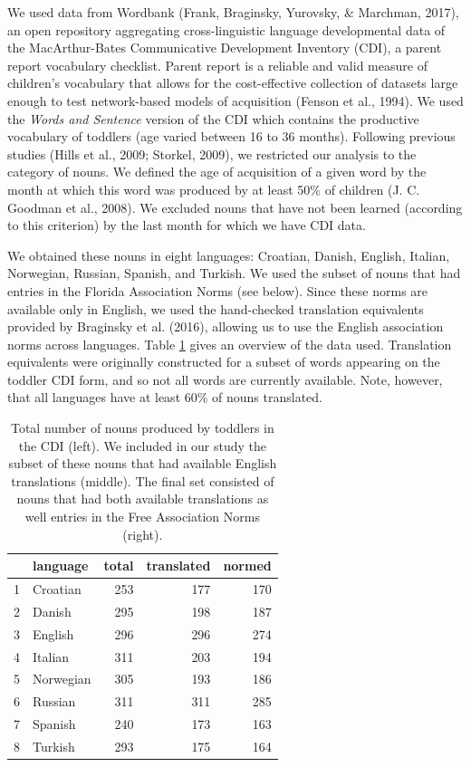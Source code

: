 \documentclass[10pt, letterpaper]{article}
\begin{document}
We used data from Wordbank (Frank, Braginsky, Yurovsky, \& Marchman,
2017), an open repository aggregating cross-linguistic language
developmental data of the MacArthur-Bates Communicative Development
Inventory (CDI), a parent report vocabulary checklist. Parent report is
a reliable and valid measure of children's vocabulary that allows for
the cost-effective collection of datasets large enough to test
network-based models of acquisition (Fenson et al., 1994). We used the
\emph{Words and Sentence} version of the CDI which contains the
productive vocabulary of toddlers (age varied between 16 to 36 months).
Following previous studies (Hills et al., 2009; Storkel, 2009), we
restricted our analysis to the category of nouns. We defined the age of
acquisition of a given word by the month at which this word was produced
by at least 50\% of children (J. C. Goodman et al., 2008). We excluded
nouns that have not been learned (according to this criterion) by the
last month for which we have CDI data.

We obtained these nouns in eight languages: Croatian, Danish, English,
Italian, Norwegian, Russian, Spanish, and Turkish. We used the subset of
nouns that had entries in the Florida Association Norms (see below).
Since these norms are available only in English, we used the
hand-checked translation equivalents provided by Braginsky et al.
(2016), allowing us to use the English association norms across
languages. Table \ref{tab:stats} gives an overview of the data used.
Translation equivalents were originally constructed for a subset of
words appearing on the toddler CDI form, and so not all words are
currently available. Note, however, that all languages have at least
60\% of nouns translated.

\begin{table}[H]
\centering
\begin{tabular}{rlrrr}
  \hline
 & language & total & translated & normed \\ 
  \hline
1 & Croatian & 253 & 177 & 170 \\ 
  2 & Danish & 295 & 198 & 187 \\ 
  3 & English & 296 & 296 & 274 \\ 
  4 & Italian & 311 & 203 & 194 \\ 
  5 & Norwegian & 305 & 193 & 186 \\ 
  6 & Russian & 311 & 311 & 285 \\ 
  7 & Spanish & 240 & 173 & 163 \\ 
  8 & Turkish & 293 & 175 & 164 \\ 
   \hline
\end{tabular}
\caption{\label{tab:stats}Total number of nouns produced by toddlers in the CDI (left). We included in our study the subset of these nouns that had available English translations (middle). The final set consisted of nouns that had both available translations as well entries in the Free Association Norms (right).} 
\end{table}
\end{document}
